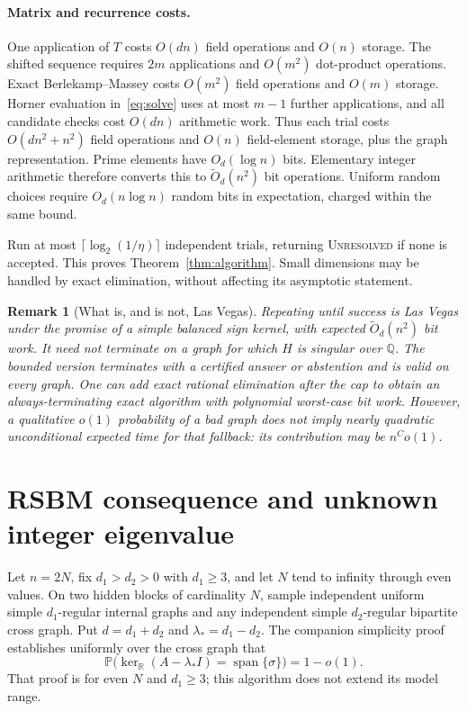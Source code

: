 \documentclass[11pt]{article}
\newtheorem{remark}[theorem]{Remark}
\newcommand{\Prob}{\mathbb P}
\begin{document}
\paragraph{Matrix and recurrence costs.}
One application of $T$ costs $O(dn)$ field operations and $O(n)$
storage. The shifted sequence requires $2m$ applications and
$O(m^2)$ dot-product operations. Exact Berlekamp--Massey costs
$O(m^2)$ field operations and $O(m)$ storage.
Horner evaluation in~\eqref{eq:solve} uses at most $m-1$ further
applications, and all candidate checks cost $O(dn)$ arithmetic work.
Thus each trial costs $O(dn^2+n^2)$ field operations and $O(n)$
field-element storage, plus the graph representation.
Prime elements have $O_d(\log n)$ bits. Elementary integer arithmetic
therefore converts this to $\widetilde O_d(n^2)$ bit operations.
Uniform random choices require $O_d(n\log n)$ random bits in
expectation, charged within the same bound.

Run at most $\lceil\log_2(1/\eta)\rceil$ independent trials, returning
\textsc{Unresolved} if none is accepted. This proves
Theorem~\ref{thm:algorithm}. Small dimensions may be handled by exact
elimination, without affecting its asymptotic statement.

\begin{remark}[What is, and is not, Las Vegas]
Repeating until success is Las Vegas under the promise of a simple
balanced sign kernel, with expected $\widetilde O_d(n^2)$ bit work.
It need not terminate on a graph for which $H$ is singular over
$\mathbb Q$. The bounded version terminates with a certified answer
or abstention and is valid on \emph{every} graph.
One can add exact rational elimination after the cap to obtain an
always-terminating exact algorithm with polynomial worst-case bit
work. However, a qualitative $o(1)$ probability of a bad graph does
not imply nearly quadratic unconditional expected time for that
fallback: its contribution may be $n^C o(1)$.
\end{remark}

\section{RSBM consequence and unknown integer eigenvalue}
Let $n=2N$, fix $d_1>d_2>0$ with $d_1\ge3$, and let $N$ tend to
infinity through even values. On two hidden blocks of cardinality $N$,
sample independent uniform simple $d_1$-regular internal graphs and
any independent simple $d_2$-regular bipartite cross graph. Put
$d=d_1+d_2$ and $\lambda_*=d_1-d_2$.
The companion simplicity proof establishes uniformly over the cross
graph that
\[
 \Prob\bigl(\ker_{\mathbb R}(A-\lambda_*I)
                 =\operatorname{span}\{\sigma\}\bigr)=1-o(1).
\]
That proof is for even $N$ and $d_1\ge3$; this algorithm does not
extend its model range.
\end{document}
